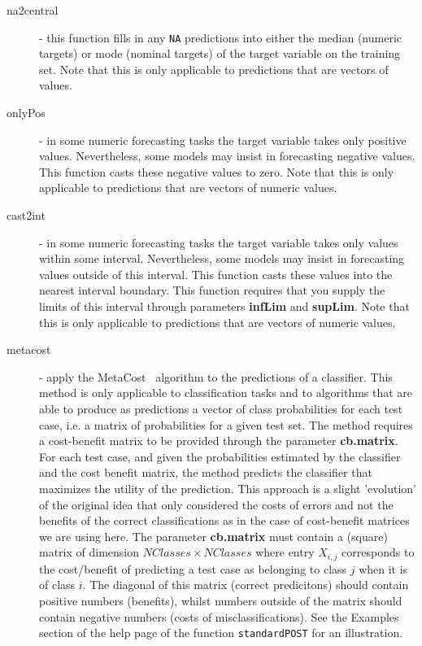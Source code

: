 \documentclass[10pt,a4paper]{article}\usepackage[]{graphicx}\usepackage[]{color}
\begin{document}
\begin{description}
\item[na2central] - this function fills in any \texttt{NA} predictions into
  either the median (numeric targets) or mode (nominal targets) of the
  target variable on the training set. Note that this is only applicable
  to predictions that are vectors of values.

\item[onlyPos] - in some numeric forecasting tasks the target variable
  takes only positive values. Nevertheless, some models may insist in
  forecasting negative values. This function casts these negative values
  to zero. Note that this is only applicable
  to predictions that are vectors of numeric values.

\item[cast2int] - in some numeric forecasting tasks the target variable
  takes only values within some interval. Nevertheless, some models may
  insist in forecasting  values outside of this interval. This function
  casts these values  into the nearest interval boundary. This function
  requires that you supply the limits of this interval through
  parameters \textbf{infLim} and \textbf{supLim}. Note that this is only
  applicable to predictions that are vectors of numeric values.

\item[metacost] - apply the MetaCost~\cite{Dom99} algorithm to the predictions of a
  classifier. This method is only applicable to classification tasks and
  to algorithms that are able to produce as predictions a vector of
  class probabilities for each test case, i.e. a matrix of probabilities
  for a given test set. The method requires a cost-benefit matrix to be
  provided through the parameter \textbf{cb.matrix}. For each test case,
  and given the probabilities estimated by the classifier and the cost
  benefit matrix, the method predicts the classifier that maximizes the
  utility of the prediction. This approach is a slight 'evolution' of
  the original idea that only considered the costs of errors and not the
  benefits of the correct classifications as in the case of cost-benefit
  matrices we are using here. The parameter \textbf{cb.matrix} must
  contain a (square) matrix of dimension $NClasses\times NClasses$ where entry
  $X_{i,j}$ corresponds to the cost/benefit of predicting a test case as
  belonging to class $j$ when it is of class $i$. The diagonal of this
  matrix (correct predicitons) should contain positive numbers
  (benefits), whilst numbers outside of the matrix should contain
  negative numbers (costs of misclassifications). See the Examples
  section of the help page of the function \texttt{standardPOST} for an illustration. 
\end{description}
\end{document}
